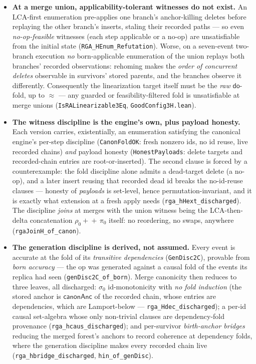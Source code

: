 \documentclass[11pt]{article}
\newcommand{\lean}[1]{\texttt{#1}}
\newcommand{\dodo}{\mathsf{do}}
\newcommand{\eqobs}{\approx}
\begin{document}
\begin{itemize}[nosep]
  \item \textbf{At a merge union, applicability-tolerant witnesses do not exist.} An
  LCA-first enumeration pre-applies one branch's anchor-killing deletes before replaying the
  other branch's inserts, staling their recorded paths --- so even \emph{no-op-feasible}
  witnesses (each step applicable or a no-op) are unsatisfiable from the initial state
  (\lean{RGA\_HEnum\_Refutation}). Worse, on a seven-event two-branch execution \emph{no}
  born-applicable enumeration of the union replays both branches' recorded observations:
  rehoming makes the \emph{order of concurrent deletes} observable in survivors' stored
  parents, and the branches observe it differently. Consequently the linearization target
  itself must be the \emph{raw} $\dodo$-fold, up to $\eqobs$ --- any guarded or
  feasibility-filtered fold is unsatisfiable at merge unions
  (\lean{IsRALinearizable3Eq}, \lean{GoodConfig3H.lean}).
  \item \textbf{The witness discipline is the engine's own, plus payload honesty.} Each
  version carries, existentially, an enumeration satisfying the canonical engine's per-step
  discipline (\lean{CanonFoldOK}: fresh nonzero ids, no id reuse, live recorded chains)
  \emph{and} payload honesty (\lean{HonestPayloads}: delete targets and recorded-chain
  entries are root-or-inserted). The second clause is forced by a counterexample: the fold
  discipline alone admits a dead-target delete (a no-op), and a later insert reusing that
  recorded dead id breaks the no-id-reuse clauses --- honesty of \emph{payloads} is
  set-level, hence permutation-invariant, and it is exactly what extension at a fresh apply
  needs (\lean{rga\_hHext\_discharged}). The discipline \emph{joins} at merges with the
  union witness being the LCA-then-delta concatenation $\rho_0 +\!\!+\, \pi_0$ itself:
  no reordering, no swaps, anywhere (\lean{rgaJoinH\_of\_canon}).
  \item \textbf{The generation discipline is derived, not assumed.} Every event is
  accurate at the fold of its \emph{transitive dependencies} (\lean{GenDisc2C}), provable
  from \emph{born accuracy} --- the op was generated against a causal fold of the events its
  replica had seen (\lean{genDisc2C\_of\_born}). Merge canonicity then reduces to three
  leaves, all discharged: $\sigma_0$ id-monotonicity with \emph{no fold induction} (the
  stored anchor is $\mathsf{canonAnc}$ of the recorded chain, whose entries are
  dependencies, which are Lamport-below --- \lean{rga\_Hdec\_discharged}); a per-id causal
  set-algebra whose only non-trivial clauses are dependency-fold provenance
  (\lean{rga\_hcaus\_discharged}); and per-survivor \emph{birth-anchor bridges} reducing
  the merged forest's anchors to record coherence at dependency folds, where the generation
  discipline makes every recorded chain live
  (\lean{rga\_hbridge\_discharged}, \lean{hin\_of\_genDisc}).
\end{itemize}
\end{document}
